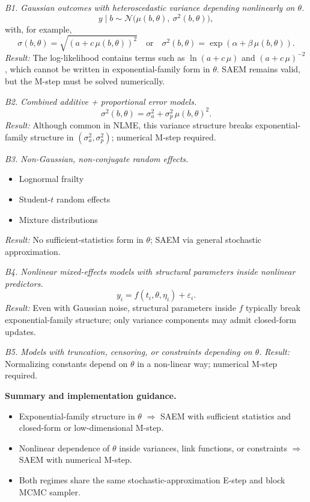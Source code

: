 \documentclass[12pt]{article}
\begin{document}
\medskip
\noindent
\emph{B1. Gaussian outcomes with heteroscedastic variance depending nonlinearly on \(\theta\).}
\[
y \mid b \sim \mathcal{N}\!\big(\mu(b,\theta),\ \sigma^2(b,\theta)\big),
\]
with, for example,
\[
\sigma(b,\theta)=\sqrt{(a + c\,\mu(b,\theta))^2}
\quad\text{or}\quad
\sigma^2(b,\theta)=\exp(\alpha+\beta\,\mu(b,\theta)).
\]
\emph{Result:} The log-likelihood contains terms such as \(\ln(a+c\,\mu)\) and \((a+c\,\mu)^{-2}\),
which cannot be written in exponential-family form in \(\theta\).
SAEM remains valid, but the M-step must be solved numerically.

\medskip
\noindent
\emph{B2. Combined additive + proportional error models.}
\[
\sigma^2(b,\theta)=\sigma_a^2 + \sigma_p^2\,\mu(b,\theta)^2.
\]
\emph{Result:} Although common in NLME, this variance structure breaks exponential-family structure in
\((\sigma_a^2,\sigma_p^2)\); numerical M-step required.

\medskip
\noindent
\emph{B3. Non-Gaussian, non-conjugate random effects.}
\begin{itemize}
\item Lognormal frailty
\item Student-\(t\) random effects
\item Mixture distributions
\end{itemize}
\emph{Result:} No sufficient-statistics form in \(\theta\); SAEM via general stochastic approximation.

\medskip
\noindent
\emph{B4. Nonlinear mixed-effects models with structural parameters inside nonlinear predictors.}
\[
y_i = f(t_i,\theta,\eta_i) + \varepsilon_i.
\]
\emph{Result:} Even with Gaussian noise, structural parameters inside \(f\) typically break exponential-family structure; only variance components may admit closed-form updates.

\medskip
\noindent
\emph{B5. Models with truncation, censoring, or constraints depending on \(\theta\).}
\emph{Result:} Normalizing constants depend on \(\theta\) in a non-linear way; numerical M-step required.

\medskip
\noindent
\textbf{Summary and implementation guidance.}
\begin{itemize}
\item Exponential-family structure in \(\theta\) $\Rightarrow$ SAEM with sufficient statistics and closed-form or low-dimensional M-step.
\item Nonlinear dependence of \(\theta\) inside variances, link functions, or constraints $\Rightarrow$ SAEM with numerical M-step.
\item Both regimes share the same stochastic-approximation E-step and block MCMC sampler.
\end{itemize}



\end{document}
